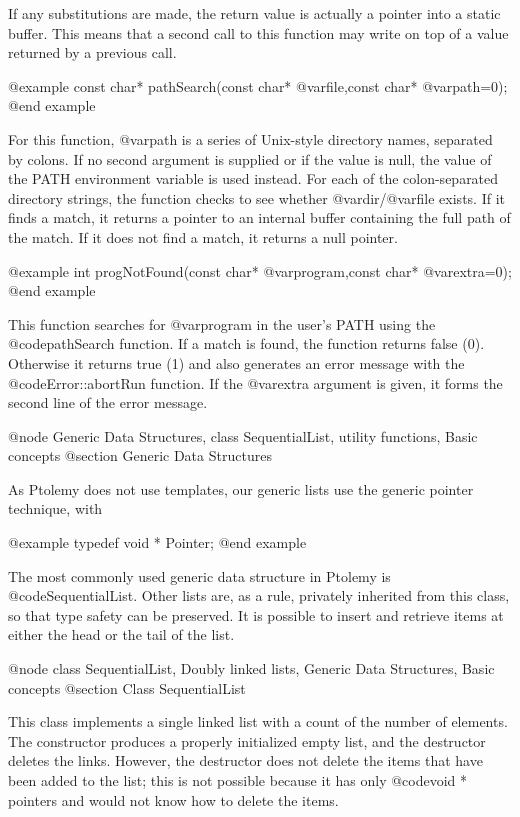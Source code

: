 If any substitutions are made, the return value is actually a pointer
into a static buffer.  This means that a second call to this function
may write on top of a value returned by a previous call.

@example
const char* pathSearch(const char* @var{file},const char* @var{path}=0);
@end example

For this function, @var{path} is a series of Unix-style directory names,
separated by colons.  If no second argument is supplied or if the value
is null, the value of the PATH environment variable is used instead.
For each of the colon-separated directory strings, the function checks
to see whether @var{dir}/@var{file} exists.  If it finds a match, it
returns a pointer to an internal buffer containing the full path of the
match.  If it does not find a match, it returns a null pointer.

@example
int progNotFound(const char* @var{program},const char* @var{extra}=0);
@end example

This function searches for @var{program} in the user's PATH using the
@code{pathSearch} function.  If a match is found, the function returns
false (0).  Otherwise it returns true (1) and also generates an error
message with the @code{Error::abortRun} function.  If the @var{extra}
argument is given, it forms the second line of the error message.

@node Generic Data Structures, class SequentialList, utility functions, Basic concepts
@section Generic Data Structures

As Ptolemy does not use templates, our generic lists use the generic pointer
technique, with

@example
typedef void * Pointer;
@end example

The most commonly used generic data structure in Ptolemy is
@code{SequentialList}.  Other lists are, as a rule, privately inherited
from this class, so that type safety can be preserved.  It is possible
to insert and retrieve items at either the head or the tail of the list.

@node class SequentialList, Doubly linked lists, Generic Data Structures, Basic concepts
@section Class SequentialList

This class implements a single linked list with a count of the number of
elements.  The constructor produces a properly initialized empty list,
and the destructor deletes the links.  However, the destructor does
not delete the items that have been added to the list; this is not
possible because it has only @code{void *} pointers and would not know
how to delete the items.

